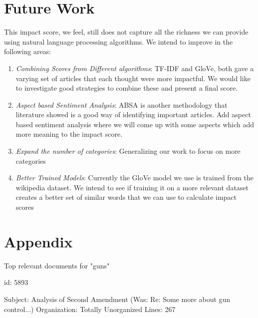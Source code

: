 \documentclass{article}
\begin{document}
\section {Future Work}
This impact score, we feel, still does not capture all the richness we can provide using natural language processing algorithms. We intend to improve in the following areas:
\begin {enumerate}
\item \textit {Combining Scores from Different algorithms}: TF-IDF and GloVe, both gave a varying set of articles that each thought were more impactful. We would like to investigate good strategies to combine these and present a final score.
\item \textit {Aspect based Sentiment Analysis}: ABSA is another methodology that literature showed is a good way of identifying important articles. Add aspect based sentiment analysis where we will come up with some aspects which add more meaning to the impact score.
\item \textit {Expand the number of categories}: Generalizing our work to focus on more categories
\item \textit {Better Trained Models}: Currently the GloVe model we use is trained from the wikipedia dataset. We intend to see if training it on a more relevant dataset creates a better set of similar words that we can use to calculate impact scores
\end {enumerate}


\maketitle
\section {Appendix}
Top relevant documents for "guns"

\item
id: 5893

Subject: Analysis of Second Amendment (Was: Re: Some more about gun control...)
Organization: Totally Unorganized
Lines: 267
\end{document}
